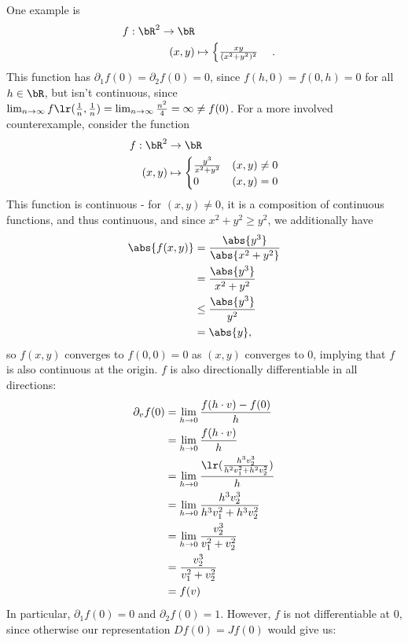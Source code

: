\newpar
One example is
\begin{align*}
	f : \bR^2 \to \bR\\
	(x,y) &\mapsto
	\begin{cases}
		\frac{xy}{(x^2 + y^2)^2}
	\end{cases}.
\end{align*}
This function has $\partial_1 f(0) = \partial_2 f(0) = 0$, since $f(h,0) = f(0,h) = 0$ for all $h \in \bR$, but isn't continuous, since $\lim_{n \to \infty} f\lr(\frac{1}{n}, \frac{1}{n}) = \lim_{n \to \infty} \frac{n^2}{4} = \infty \neq f(0)$.
\newpar
For a more involved counterexample, consider the function
\begin{align*}
	f : \bR^2 &\to \bR\\
	(x,y) &\mapsto 
	\begin{cases}
		\frac{y^3}{x^2 + y^2} & (x,y) \neq 0\\
		0 & (x,y) = 0
	\end{cases}
\end{align*}
This function is continuous - for $(x,y) \neq 0$, it is a composition of continuous functions, and thus continuous, and since $x^2 + y^2 \geq y^2$, we additionally have
\begin{align*}
	\abs{f(x,y)} 
	&= \frac{\abs{y^3}}{\abs{x^2 + y^2}}\\
	&= \frac{\abs{y^3}}{x^2 + y^2}\\
	&\leq \frac{\abs{y^3}}{y^2}\\
	&= \abs{y},
\end{align*}
so $f(x,y)$ converges to $f(0,0) = 0$ as $(x,y)$ converges to $0$, implying that $f$ is also continuous at the origin.
\newpar
$f$ is also directionally differentiable in all directions:
\begin{align*}
	\partial_v f(0)
	&= \lim_{h \to 0} \frac{f(h \cdot v) - f(0)}{h}\\
	&= \lim_{h \to 0} \frac{f(h \cdot v)}{h}\\
	&= \lim_{h \to 0} \frac{\lr(\frac{h^3v_2^3}{h^2 v_1^2 + h^2 v_2^2})}{h}\\
	&= \lim_{h \to 0} \frac{h^3v_2^3}{h^3 v_1^2 + h^3 v_2^2}\\
	&= \lim_{h \to 0} \frac{v_2^3}{v_1^2 + v_2^2}\\
	&= \frac{v_2^3}{v_1^2 + v_2^2}\\ 
	&= f(v)
\end{align*}
In particular, $\partial_1 f(0) = 0$ and $\partial_2 f(0) = 1$. However, $f$ is not differentiable at $0$, since otherwise our representation $Df(0) = Jf(0)$ would give us:
